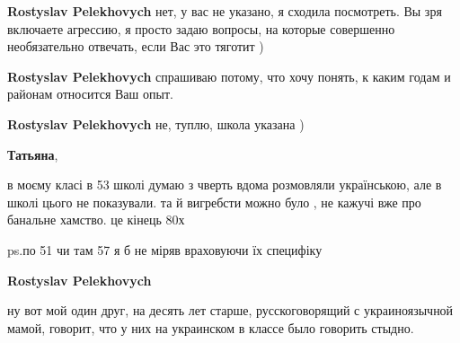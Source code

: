 \begin{itemize}
\begin{itemize}
 
\textbf{Rostyslav Pelekhovych} нет, у вас не указано, я сходила посмотреть. Вы зря включаете агрессию, я просто задаю вопросы, на которые совершенно необязательно отвечать, если Вас это тяготит )

 
\textbf{Rostyslav Pelekhovych} спрашиваю потому, что хочу понять, к каким годам и районам относится Ваш опыт.

 
\textbf{Rostyslav Pelekhovych} не, туплю, школа указана )

 
\textbf{Татьяна}, 

в моєму класі в 53 школі думаю з чверть вдома розмовляли українською, але в
школі цього не показували. та й вигребсти можно було , не кажучі вже про
банальне хамство. це кінець 80х

ps.по 51 чи там 57 я б не міряв враховуючи їх специфіку

 
\textbf{Rostyslav Pelekhovych} 

ну вот мой один друг, на десять лет старше, русскоговорящий с украиноязычной
мамой, говорит, что у них на украинском в классе было говорить стыдно.


 


\end{itemize}
\end{itemize}

